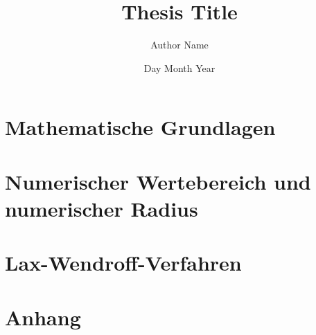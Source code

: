 \documentclass[12pt]{article}
\title{Thesis Title}
\author{Author Name}
\date{Day Month Year}
\theoremstyle{plain}
\theoremstyle{definition}
\theoremstyle{remark}
\begin{document}
	
	
	
	\tableofcontents
	\thispagestyle{empty}
	\setcounter{page}{0}

	

	\listoffigures

	\pagestyle{fancy}
	\fancyhf{}
	\fancyhead[L]{\leftmark}
	\fancyfoot[R]{\thepage}


	\section{Mathematische Grundlagen}
	
	
	\section[Numerischer Wertebereich und numerischer Radius]{Numerischer Wertebereich und \\numerischer Radius}
	

	\section[Lax-Wendroff-Verfahren ]{Lax-Wendroff-Verfahren}
	

	\clearpage

	\section*{Anhang}
	
	\clearpage

	\pagestyle{fancy}
	\fancyfoot[R]{\thepage}
	\printbibliography[heading=bibintoc, title=Literaturverzeichnis]
\end{document}
